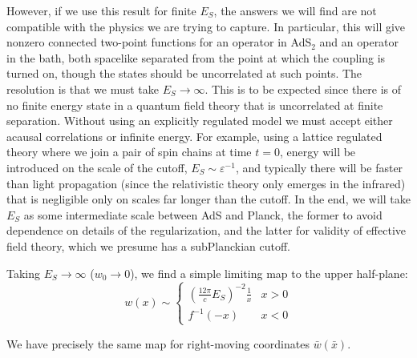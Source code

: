 \documentclass[12pt]{article}
\begin{document}
However, if we use this result for finite $E_S$, the answers we will find are not compatible with the physics we are trying to capture. In particular, this will give nonzero connected two-point functions for an operator in AdS$_2$ and an operator in the bath, both spacelike separated from the point at which the coupling is turned on, though the states should be uncorrelated at such points. The resolution is that we must take $E_S\to\infty$. This is to be expected since there is of no finite energy state in a quantum field theory that is uncorrelated at finite separation. Without using an explicitly regulated model we must accept either acausal correlations or infinite energy. For example, using a lattice regulated theory where we join a pair of spin chains at time $t=0$, energy will be introduced on the scale of the cutoff, $E_S\sim \varepsilon^{-1}$, and typically there will be faster than light propagation (since the relativistic theory only emerges in the infrared) that is negligible only on scales far longer than the cutoff. In the end, we will take $E_S$ as some intermediate scale between AdS and Planck, the former to avoid dependence on details of the regularization, and the latter for validity of effective field theory, which we presume has a subPlanckian cutoff.

Taking $E_S\to\infty$ ($w_0\to 0$),  we find a simple limiting map to the upper half-plane:
\begin{equation}
	w(x) \sim  \begin{cases}
		 \left(\frac{12\pi}{c}E_S\right)^{-2}\frac{1}{x} & x>0 \\
		 f^{-1}(-x) & x<0
	\end{cases}
\end{equation}


We have precisely the same map for right-moving coordinates $\bar{w}(\bar{x})$.
\end{document}
